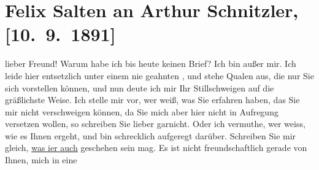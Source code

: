 

         
         \renewcommand{\erwaehntePersonen}{Personen: Bertha Karlsburg, Felix Salten}
         \renewcommand{\erwaehnteOrte}{Orte: Hotel Stadt Pest, Miskolc, Wien}
         \renewcommand{\erwaehnteWerke}{}
               \section[Felix Salten an Arthur Schnitzler, {[}10. 9. 1891{]}]{ Felix Salten an Arthur Schnitzler, {[}10. 9. 1891{]}}\nopagebreak{}\rehead{ }\begin{ledgroupsized}[t]{13cm}\normalsize\beginnumbering{} \toendnotes[C]{\smallbreak\pagebreak[2]} 
\toendnotes[C]{\smallbreak}\pstart
           \noindent{}{\pb}lieber Freund! Warum habe ich bis heute keinen Brief? Ich bin außer mir. Ich leide hier entsetzlich unter einem
               nie geahnten \label{K_L03104-1v}\label{K_L03104-1h}, und stehe Qualen aus, die nur Sie sich vorstellen können, und nun deute ich
               mir Ihr Stillschweigen auf die gräßlichste Weise. Ich stelle mir vor, wer weiß, was
               Sie erfahren haben,  das Sie mir nicht verschweigen
               können, da Sie mich aber hier nicht in Aufregung
               versetzen wollen, so schreiben Sie lieber garnicht. Oder ich vermuthe, wer weiss, wie
               es Ihnen  ergeht, und bin schrecklich aufgeregt
               darüber. Schreiben Sie mir gleich, \uline{was i{\geminationm}er auch} geschehen sein mag.\pend
           \pstart
           Es ist nicht freundschaftlich gerade von {\pb}Ihnen, mich in eine

\end{ledgroupsized}
